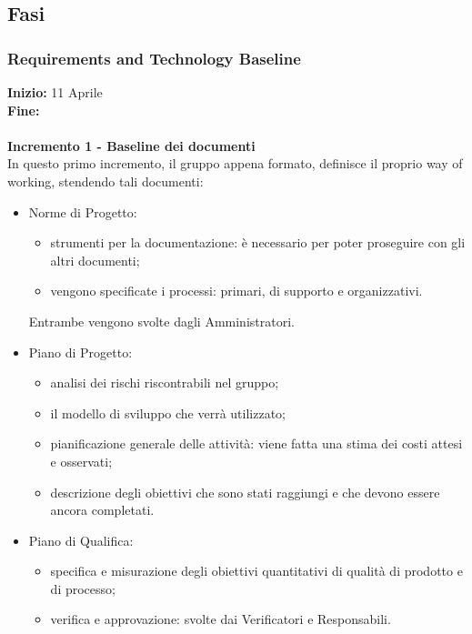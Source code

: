 \subsection{Fasi} 
{    
    \subsubsection{Requirements and Technology Baseline} 
    {
    \textbf{Inizio:} 11 Aprile \\
    \textbf{Fine:} \\ \\ %
    \textbf{Incremento 1 - Baseline dei documenti} \\ 
    In questo primo incremento, il gruppo appena formato, definisce il proprio way of working, stendendo tali documenti:
    \begin{itemize}
        \item Norme di Progetto:
            \begin{itemize}
                \item strumenti per la documentazione: è necessario per poter proseguire con gli altri documenti;
                \item vengono specificate i processi: primari, di supporto e organizzativi. 
            \end{itemize}
        Entrambe vengono svolte dagli Amministratori.
        \item Piano di Progetto: 
            \begin{itemize}
                \item analisi dei rischi riscontrabili nel gruppo;
                \item il modello di sviluppo che verrà utilizzato;
                \item pianificazione generale delle attività: viene fatta una stima dei costi attesi e osservati;
                \item descrizione degli obiettivi che sono stati raggiungi e che devono essere ancora completati.
            \end{itemize}
        \item Piano di Qualifica: 
            \begin{itemize}
                \item specifica e misurazione degli obiettivi quantitativi di qualità di prodotto e di processo;
                \item verifica e approvazione: svolte dai Verificatori e Responsabili.
            \end{itemize}

\end{itemize}}}
